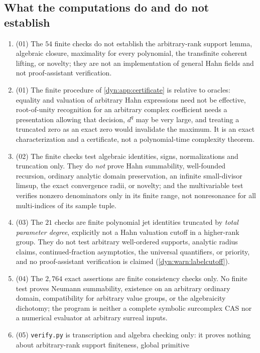 \documentclass[11pt,letterpaper]{article}
\theoremstyle{definition}
\theoremstyle{remark}
\numberwithin{equation}{section}
\begin{document}
\subsection{What the computations do and do not establish}
\begin{enumerate}[label=\textbf{N\arabic*.},leftmargin=3.2em,start=63]
\item (01) The $54$ finite checks do not establish the arbitrary-rank
support lemma, algebraic closure, maximality for every polynomial, the
transfinite coherent lifting, or novelty; they are not an implementation of
general Hahn fields and not proof-assistant verification.
\item (01) The finite procedure of \cref{dyn:app:certificate} is relative
to oracles: equality and valuation of arbitrary Hahn expressions need not
be effective, root-of-unity recognition for an arbitrary complex
coefficient needs a presentation allowing that decision, $d^{q}$ may be
very large, and treating a truncated zero as an exact zero would invalidate
the maximum. It is an exact characterization and a certificate, not a
polynomial-time complexity theorem.
\item (02) The finite checks test algebraic identities, signs,
normalizations and truncation only. They do \emph{not} prove Hahn
summability, well-founded recursion, ordinary analytic domain preservation,
an infinite small-divisor limsup, the exact convergence radii, or novelty;
and the multivariable test verifies nonzero denominators only in its finite
range, not nonresonance for all multi-indices of its sample tuple.
\item (03) The $21$ checks are finite polynomial jet identities truncated
by \emph{total parameter degree}, explicitly not a Hahn valuation cutoff in
a higher-rank group. They do not test arbitrary well-ordered supports,
analytic radius claims, continued-fraction asymptotics, the universal
quantifiers, or priority, and no proof-assistant verification is claimed
(\cref{dyn:warn:labelcutoff}).
\item (04) The $2{,}764$ exact assertions are finite consistency checks
only. No finite test proves Neumann summability, existence on an arbitrary
ordinary domain, compatibility for arbitrary value groups, or the
algebraicity dichotomy; the program is neither a complete symbolic
surcomplex CAS nor a numerical evaluator at arbitrary surreal inputs.
\item (05) \texttt{verify.py} is transcription and algebra checking only:
it proves nothing about arbitrary-rank support finiteness, global primitive

\end{enumerate}
\end{document}
